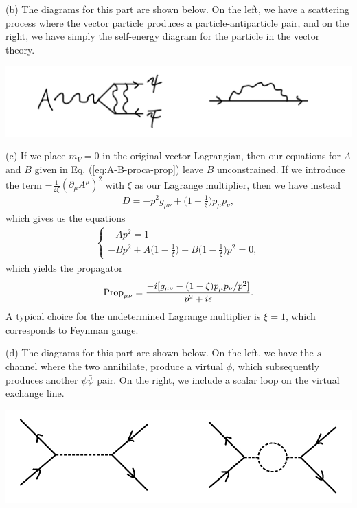 {(b) The diagrams for this part are shown below.
On the left, we have a scattering process where the vector particle produces a particle-antiparticle pair, and on the right, we have simply the self-energy diagram for the particle in the vector theory.

\begin{center}
    \includegraphics[width=\linewidth]{part_b.jpeg}
\end{center}

(c) If we place $m_{V} = 0$ in the original vector Lagrangian, then our equations for $A$ and $B$ given in Eq. (\ref{eq:A-B-proca-prop}) leave $B$ unconstrained.
If we introduce the term $-\frac{1}{2 \xi} (\partial_{\mu} A^{\mu})^2$ with $\xi$ as our Lagrange multiplier, then we have instead
\begin{align}
    D = - p^2 g_{\mu\nu} + \Big( 1 - \frac{1}{\xi} \Big) p_{\mu} p_{\nu}
,\end{align}
which gives us the equations
\begin{align}
\begin{cases}
    - A p^2 = 1 \\
    - B p^2 + A \Big( 1 - \frac{1}{\xi} \Big) + B \Big( 1 - \frac{1}{\xi} \Big) p^2 = 0
,\end{cases}
\end{align}
which yields the propagator
\begin{align}
    {\rm Prop}_{\mu\nu} = \frac{-i [ g_{\mu\nu} - (1 - \xi) p_{\mu} p_{\nu} / p^2 ]}{p^2 + i \epsilon}
.\end{align}
A typical choice for the undetermined Lagrange multiplier is $\xi = 1$, which corresponds to Feynman gauge.


(d) The diagrams for this part are shown below.
On the left, we have the $s$-channel where the two annihilate, produce a virtual $\phi$, which subsequently produces another $\psi \bar{\psi}$ pair.
On the right, we include a scalar loop on the virtual exchange line.

\begin{center}
    \includegraphics[width=\linewidth]{part_d.jpeg}
\end{center}


}
